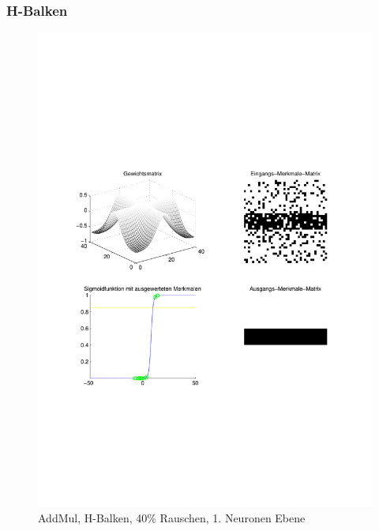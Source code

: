 \subsubsection{H-Balken}
\begin{figure}[hbt]
	\begin{minipage}{0.8 \textwidth}
		\includegraphics[width=\textwidth]{./Bilder/Auswertung/Endergebnis/TypeAddMul_Rauschen40_H_Line_Layer1}
		\caption{AddMul, H-Balken, 40\% Rauschen, 1. Neuronen Ebene}
		\label{AddMul_H_40_1}
	\end{minipage}
	\vfill
	\begin{minipage}{0.8 \textwidth}

\end{minipage}
\end{figure}

